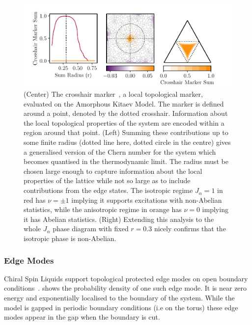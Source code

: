 \hypertarget{fig:phase_diagram_chern}{%
\begin{figure}
\centering
\includegraphics[width=1\textwidth,height=\textheight]{figure_code/amk_chapter/results/phase_diagram_chern/phase_diagram_chern}
\caption[{Local Chern Markers}]{(Center) The crosshair marker~\autocite{peru_preprint}, a local topological marker, evaluated on the Amorphous Kitaev Model. The marker is defined around a point, denoted by the dotted crosshair. Information about the local topological properties of the system are encoded within a region around that point. (Left) Summing these contributions up to some finite radius (dotted line here, dotted circle in the centre) gives a generalised version of the Chern number for the system which becomes quantised in the thermodynamic limit. The radius must be chosen large enough to capture information about the local properties of the lattice while not so large as to include contributions from the edge states. The isotropic regime \(J_\alpha = 1\) in red has \(\nu = \pm 1\) implying it supports excitations with non-Abelian statistics, while the anisotropic regime in orange has \(\nu = 0\) implying it has Abelian statistics. (Right) Extending this analysis to the whole \(J_\alpha\) phase diagram with fixed \(r = 0.3\) nicely confirms that the isotropic phase is non-Abelian.}
\label{fig:phase_diagram_chern}
\end{figure}
}

\hypertarget{edge-modes}{%
\subsubsection{Edge Modes}\label{edge-modes}}

Chiral Spin Liquids support topological protected edge modes on open boundary conditions~\autocite{qi_general_2006}.  shows the probability density of one such edge mode. It is near zero energy and exponentially localised to the boundary of the system. While the model is gapped in periodic boundary conditions (i.e on the torus) these edge modes appear in the gap when the boundary is cut.

